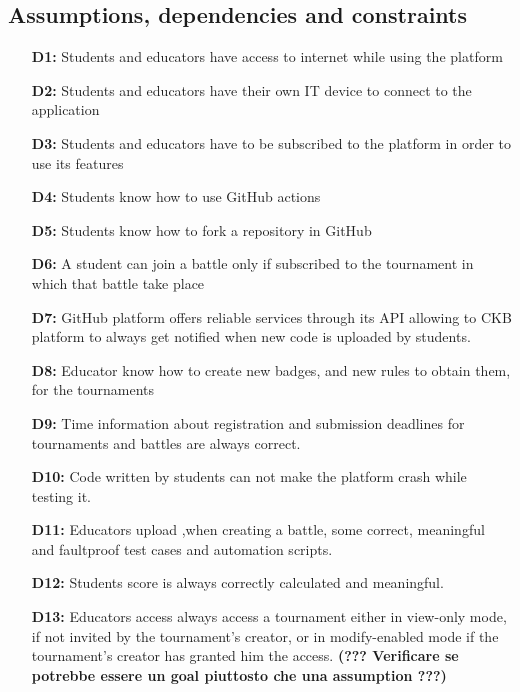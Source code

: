 \documentclass{article}
\begin{document}
{    \subsection{Assumptions, dependencies and constraints}
        \begin{itemize}
            \item[\textbf{D1:}] Students and educators have access to internet while using the platform
            \item[\textbf{D2:}] Students and educators have their own IT device to connect to the application
            \item[\textbf{D3:}] Students and educators have to be subscribed to the platform in order to use its features
            \item[\textbf{D4:}] Students know how to use GitHub actions
            \item[\textbf{D5:}] Students know how to fork a repository in GitHub
            \item[\textbf{D6:}] A student can join a battle only if subscribed to the tournament in which that battle take place
            \item[\textbf{D7:}] GitHub platform offers reliable services through its API allowing to CKB platform to always get notified when new code is uploaded by students.
            \item[\textbf{D8:}] Educator know how to create new badges, and new rules to obtain them, for the tournaments
            \item[\textbf{D9:}] Time information about registration and submission deadlines for tournaments and battles are always correct.
            \item[\textbf{D10:}] Code written by students can not make the platform crash while testing it.
            \item[\textbf{D11:}] Educators upload ,when creating a battle, some correct, meaningful and faultproof test cases and automation scripts.
            \item[\textbf{D12:}] Students score is always correctly calculated and meaningful.
            \item[\textbf{D13:}] Educators access always access a tournament either in view-only mode, if not invited by the tournament's creator, or in modify-enabled mode if the tournament's creator has granted him the access.
            \textbf{(??? Verificare se potrebbe essere un goal piuttosto che una assumption ???)}
        \end{itemize}

}
\end{document}
